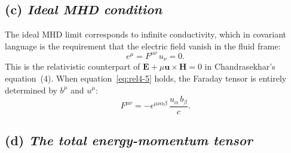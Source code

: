 \subsection*{(c) \emph{Ideal MHD condition}}

The ideal MHD limit corresponds to infinite conductivity, which in
covariant language is the requirement that the electric field vanish in the
fluid frame:
\begin{equation}\label{eq:rel4-5}
  e^{\mu} = F^{\mu\nu}\,u_{\nu} = 0.
\end{equation}
This is the relativistic counterpart of $\mathbf{E}+\mu\mathbf{u}\times
\mathbf{H}=0$ in Chandrasekhar's equation~(4).  When
equation~\eqref{eq:rel4-5} holds, the Faraday tensor is entirely determined
by $b^{\mu}$ and $u^{\mu}$:
\begin{equation}\label{eq:rel4-6}
  F^{\mu\nu} = -\epsilon^{\mu\nu\alpha\beta}\,
    \frac{u_{\alpha}\,b_{\beta}}{c}.
\end{equation}

\subsection*{(d) \emph{The total energy-momentum tensor}}

